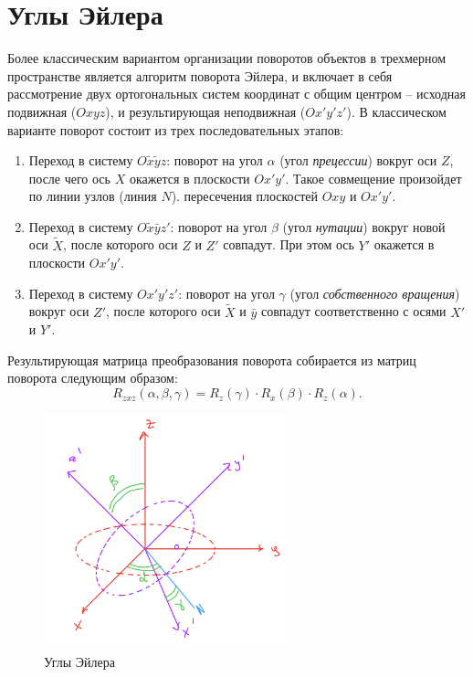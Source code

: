 \documentclass[fleqn]{extarticle}
\begin{document}
	\pagebreak
	\section{Углы Эйлера}

	Более классическим вариантом организации поворотов объектов в трехмерном пространстве является алгоритм поворота Эйлера, 
	и включает в себя рассмотрение двух ортогональных систем координат с общим центром -- исходная 
	подвижная ($Oxyz$), и результирующая неподвижная ($Ox'y'z'$). В классическом варианте поворот 
	состоит из трех последовательных этапов:
	\begin{enumerate}
		\item Переход в систему $O\tilde{x}\tilde{y}z$: поворот на угол $\alpha$ (угол \textit{прецессии}) 
			вокруг оси $Z$, после чего ось $X$ окажется в плоскости $Ox'y'$. Такое совмещение произойдет по 
			линии узлов (линия $N$). пересечения плоскостей $Oxy$ и $Ox'y'$. 

		\item Переход в систему $O\tilde{x}\bar{y}z'$: поворот на угол $\beta$ (угол \textit{нутации}) вокруг новой 
			оси $\tilde{X}$, после которого оси $Z$ и $Z'$ совпадут. При этом ось $Y'$ окажется в плоскости $Ox'y'$.

		\item Переход в систему $Ox'y'z'$: поворот на угол $\gamma$ (угол \textit{собственного вращения}) вокруг 
			оси $Z'$, после которого оси $\tilde{X}$ и $\bar{y}$ совпадут соответственно с осями $X'$ и $Y'$. 
	\end{enumerate}

	Результирующая матрица преобразования поворота собирается из матриц поворота следующим образом:
	\[ R_{zxz}(\alpha, \beta, \gamma) = R_z(\gamma) \cdot R_x(\beta) \cdot R_z(\alpha). \]

	\begin{figure}[h]
		\centering
		\includegraphics[width=7cm]{pictures/euler.png}
		\caption{Углы Эйлера}
	\end{figure}
\end{document}
